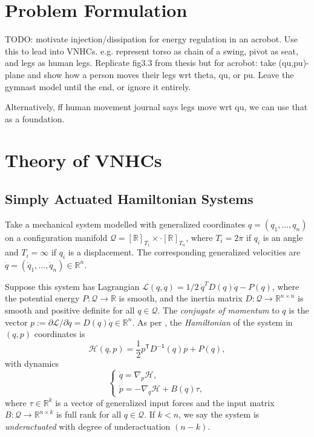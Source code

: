 \documentclass[journal,twoside,web]{ieeecolor}
\newcommand*{\tpose}{^\mathsf{T}}
\newcommand*{\inv}{^\mathsf{-1}}
\newcommand*{\Rt}[1]{[\R]_{#1}}
\newcommand*{\R}{\mathbb{R}}
\begin{document}
\section{Problem Formulation}\label{sec:problem-formulation}
TODO: motivate injection/dissipation for energy regulation in an acrobot. Use
this to lead into VNHCs. e.g. represent torso as chain of a swing, pivot as
seat, and legs as human legs. Replicate fig3.3 from thesis but for acrobot: take
(qu,pu)-plane and show how a person moves their legs wrt theta, qu, or pu. Leave
the gymnast model until the end, or ignore it entirely.

Alternatively, ff human movement journal says legs move wrt qu, we can use that
as a foundation.

\section{Theory of VNHCs}\label{sec:vnhc}

\subsection{Simply Actuated Hamiltonian Systems}
Take a mechanical system modelled with generalized coordinates 
\(q = (q_1, \ldots, q_n)\) on a configuration manifold
\(\mathcal{Q} = \Rt{T_1} \times \cdot \Rt{T_n}\), where
\(T_i = 2\pi\) if \(q_i\) is an angle and \(T_i = \infty\) if \(q_i\) is a
displacement. The corresponding generalized velocities are 
\(\dot{q} = (\dot{q}_1,\ldots,\dot{q}_n) \in \R^n\).

Suppose this system has Lagrangian
\(\mathcal{L}(q,\dot{q}) = 1/2~\dot{q}^T D(q) \dot{q} - P(q)\),
where the potential energy 
\(P : \mathcal{Q} \rightarrow \mathbb{R}\) 
is smooth, and the inertia matrix 
\(D : \mathcal{Q} \rightarrow \mathbb{R}^{n \times n}\)
is smooth and positive definite for all \(q \in \mathcal{Q}\).
The \textit{conjugate of momentum} to \(q\) is the vector
\(p := \partial\mathcal{L}/\partial\dot{q} = D(q) \dot{q} \in \R^n\).
As per \cite{landau_mechanics}, 
the \textit{Hamiltonian} of the system in \((q,p)\) coordinates
is
\begin{equation}\label{eqn:hamiltonian}
    \mathcal{H}(q,p) = \frac{1}{2} p\tpose D\inv(q) p + P(q)
    ,
\end{equation}
with dynamics
\begin{equation}\label{eqn:hamiltonian-eom-general}
    \begin{cases}
        \dot{q} = \nabla_p\mathcal{H} 
        , \\
        \dot{p} = -\nabla_q\mathcal{H} + B(q) \tau
        ,
    \end{cases}
\end{equation}
where \(\tau \in \R^k\) is a vector of generalized input forces and the input
matrix \(B : \mathcal{Q} \rightarrow \R^{n \times k}\) is full rank for all 
\(q \in \mathcal{Q}\).
If \(k < n\), we say the system is \textit{underactuated} with degree of
underactuation \((n-k)\).
\end{document}
